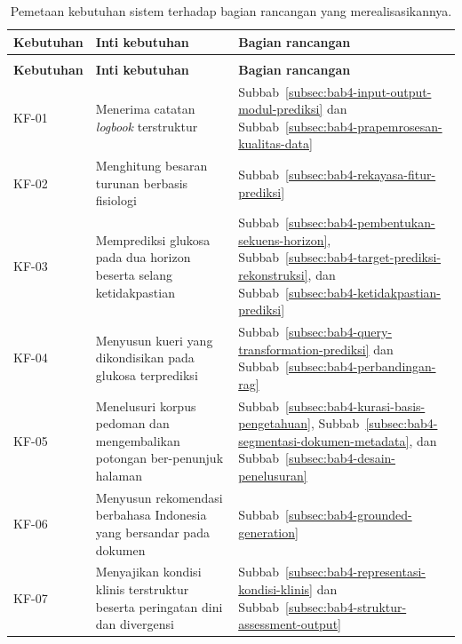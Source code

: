 \begingroup
\setlength{\LTcapwidth}{\textwidth}
\small
\captionsetup{font=normalsize}
\setlength{\tabcolsep}{4pt}
\begin{longtable}{@{}>{\raggedright\arraybackslash}p{1.750cm}>{\raggedright\arraybackslash}p{5.350cm}>{\raggedright\arraybackslash}p{6.338cm}@{}}
\caption{Pemetaan kebutuhan sistem terhadap bagian rancangan yang merealisasikannya.}
\label{tab:tab4.2_pemetaan_kebutuhan_rancangan} \\
\toprule
\textbf{Kebutuhan} & \textbf{Inti kebutuhan} & \textbf{Bagian rancangan} \\
\midrule
\endfirsthead

\multicolumn{3}{@{}l}{\small\emph{Tabel \thetable{} (lanjutan)}} \\
\toprule
\textbf{Kebutuhan} & \textbf{Inti kebutuhan} & \textbf{Bagian rancangan} \\
\midrule
\endhead

\bottomrule
\endlastfoot

KF-01 & Menerima catatan \emph{logbook} terstruktur & Subbab~\ref{subsec:bab4-input-output-modul-prediksi} dan Subbab~\ref{subsec:bab4-prapemrosesan-kualitas-data} \\

KF-02 & Menghitung besaran turunan berbasis fisiologi & Subbab~\ref{subsec:bab4-rekayasa-fitur-prediksi} \\

KF-03 & Memprediksi glukosa pada dua horizon beserta selang ketidakpastian & Subbab~\ref{subsec:bab4-pembentukan-sekuens-horizon}, Subbab~\ref{subsec:bab4-target-prediksi-rekonstruksi}, dan Subbab~\ref{subsec:bab4-ketidakpastian-prediksi} \\

KF-04 & Menyusun kueri yang dikondisikan pada glukosa terprediksi & Subbab~\ref{subsec:bab4-query-transformation-prediksi} dan Subbab~\ref{subsec:bab4-perbandingan-rag} \\

KF-05 & Menelusuri korpus pedoman dan mengembalikan potongan ber-penunjuk halaman & Subbab~\ref{subsec:bab4-kurasi-basis-pengetahuan}, Subbab~\ref{subsec:bab4-segmentasi-dokumen-metadata}, dan Subbab~\ref{subsec:bab4-desain-penelusuran} \\

KF-06 & Menyusun rekomendasi berbahasa Indonesia yang bersandar pada dokumen & Subbab~\ref{subsec:bab4-grounded-generation} \\

KF-07 & Menyajikan kondisi klinis terstruktur beserta peringatan dini dan divergensi & Subbab~\ref{subsec:bab4-representasi-kondisi-klinis} dan Subbab~\ref{subsec:bab4-struktur-assessment-output} \\


\end{longtable}
